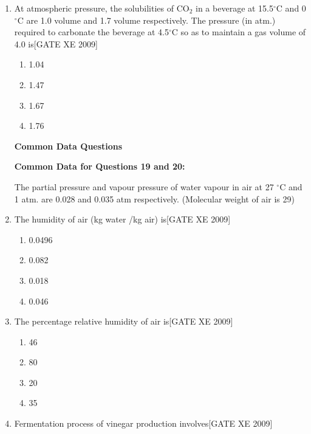 \documentclass[journal,12pt,onecolumn]{IEEEtran}
\theoremstyle{remark}
\begin{document}
\begin{enumerate}[label=\textbf{Q.\arabic*.}, wide=0pt, leftmargin=*]
\item At atmospheric pressure, the solubilities of CO$_2$ in a beverage at 15.5$^\circ$C and 0$^\circ$C are 1.0 volume and 1.7 volume respectively. The pressure (in atm.) required to carbonate the beverage at 4.5$^\circ$C so as to maintain a gas volume of 4.0 is\hfill[GATE XE 2009]

\begin{multicols}{2}
\begin{enumerate}
\item 1.04
\item 1.47
\item 1.67
\item 1.76
\end{enumerate}
\end{multicols}

\vspace{1em}
\noindent\textbf{Common Data Questions}

\noindent\textbf{Common Data for Questions 19 and 20:}

\vspace{0.5em}
The partial pressure and vapour pressure of water vapour in air at 27 $^\circ$C and 1 atm. are 0.028 and 0.035 atm respectively. (Molecular weight of air is 29)

\item The humidity of air (kg water /kg air) is\hfill[GATE XE 2009]

\begin{multicols}{2}
\begin{enumerate}
\item 0.0496
\item 0.082
\item 0.018
\item 0.046
\end{enumerate}
\end{multicols}

\item The percentage relative humidity of air is\hfill[GATE XE 2009]

\begin{multicols}{2}
\begin{enumerate}
\item 46
\item 80
\item 20
\item 35
\end{enumerate}
\end{multicols}

\item Fermentation process of vinegar production involves\hfill[GATE XE 2009]


\end{enumerate}
\end{document}
